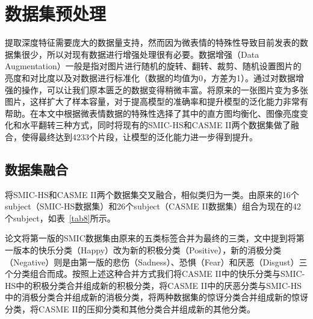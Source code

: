 \section{数据集预处理}

提取深度特征需要庞大的数据量支持，然而因为微表情的特殊性导致目前发表的数据集很少，所以对现有数据进行增强处理很有必要。数据增强（Data Augmentation）一般是指对图片进行随机的旋转、翻转、裁剪、随机设置图片的亮度和对比度以及对数据进行标准化（数据的均值为0，方差为1）。通过对数据增强的操作，可以让我们原本匮乏的数据变得稍微丰富。将原来的一张图片变为多张图片，这样扩大了样本容量，对于提高模型的准确率和提升模型的泛化能力非常有帮助。在本文中根据微表情数据的特殊性选择了其中的直方图均衡化、图像亮度变化和水平翻转三种方式，同时将现有的SMIC-HS和CASME II两个数据集做了融合，使得最终达到4233个片段，让模型的泛化能力进一步得到提升。

\subsection{数据集融合}

将SMIC-HS和CASME II两个数据集交叉融合，相似类归为一类。由原来的16个subject（SMIC-HS数据集）和26个subject（CASME II数据集）组合为现在的42个subject，如表~\ref{tab8}所示。

\begin{table}[!htbp]
\renewcommand\arraystretch{1.5}
\centering
\caption{融合后数据集情况}
\label{tab8}
\end{table}

论文将第一版的SMIC数据集由原来的五类标签合并为最终的三类，文中提到将第一版本的快乐分类（Happy）改为新的积极分类（Positive），新的消极分类（Negative）则是由第一版的悲伤（Sadness）、恐惧（Fear）和厌恶（Disgust）三个分类组合而成。按照上述这种合并方式我们将CASME II中的快乐分类与SMIC-HS中的积极分类合并组成新的积极分类，将CASME II中的厌恶分类与SMIC-HS中的消极分类合并组成新的消极分类，将两种数据集的惊讶分类合并组成新的惊讶分类，将CASME II的压抑分类和其他分类合并组成新的其他分类。

